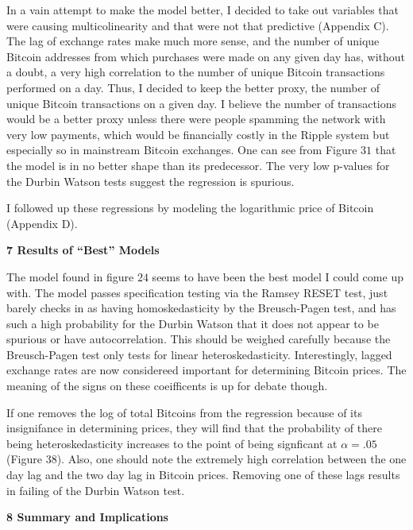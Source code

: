 \documentclass{article}[10 pt]
\newcommand{\vs}{\vspace{0.1in}}
\begin{document}
\vs

In a vain attempt to make the model better, I decided to take out variables
that were causing multicolinearity and that were not that predictive
(Appendix C). The lag of exchange rates make much more sense, and the
number of unique Bitcoin addresses from which purchases were made on any
given day has, without a doubt, a very high correlation to the number of
unique Bitcoin transactions performed on a day. Thus, I decided to keep the
better proxy, the number of unique Bitcoin transactions on a given day. I
believe the number of transactions would be a better proxy unless there
were people spamming the network with very low payments, which would be
financially costly in the Ripple system but especially so in mainstream
Bitcoin exchanges. One can see from Figure $31$ that the model is in no
better shape than its predecessor. The very low p-values for the Durbin
Watson tests suggest the regression is spurious.

\vs

I followed up these regressions by modeling the logarithmic price of
 Bitcoin (Appendix D). 

\vs

\textbf{7 Results of “Best” Models}

\vs

The model found in figure $24$ seems to have been the best model I could
come up with. The model passes specification testing via the Ramsey RESET
test, just barely checks in as having homoskedasticity by the Breusch-Pagen
test, and has such a high probability for the Durbin Watson that it does
not appear to be spurious or have autocorrelation. This should be weighed
carefully because the Breusch-Pagen test only tests for linear
heteroskedasticity. Interestingly, lagged exchange rates are now
considereed important for determining Bitcoin prices. The meaning of the
signs on these coeifficents is up for debate though. 

\vs

If one removes the log of total Bitcoins from the regression because of its
insignifance in determining prices, they will find that the probability of
there being heteroskedasticity increases to the point of being signficant at
$\alpha=.05$ (Figure $38$). Also, one should note the extremely high
correlation between the one day lag and the two day lag in Bitcoin prices.
Removing one of these lags results in failing of the Durbin Watson test.   

\vs

\textbf{8 Summary and Implications}
\end{document}

